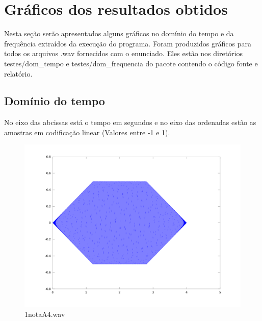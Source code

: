 \documentclass[brazil,times]{abnt}
\begin{document}
\chapter{Gráficos dos resultados obtidos}
	Nesta seção serão apresentados alguns gráficos no domínio do tempo e da frequência extraídos da execução do programa. Foram produzidos gráficos para todos os arquivos .wav fornecidos com o enunciado. Eles estão nos diretórios testes/dom_tempo e testes/dom_frequencia do pacote contendo o código fonte e relatório.

	\section{Domínio do tempo}
		No eixo das abcissas está o tempo em segundos e no eixo das ordenadas estão as amostras em codificação linear (Valores entre -1 e 1).
			\begin{figure}[h!]
			\begin{center}
			  \includegraphics[width=150mm]{imagens/1notaA4_tempo.png}
			  \caption[1notaA4.wav]{1notaA4.wav}
			\end{center}
			\end{figure}
\end{document}
